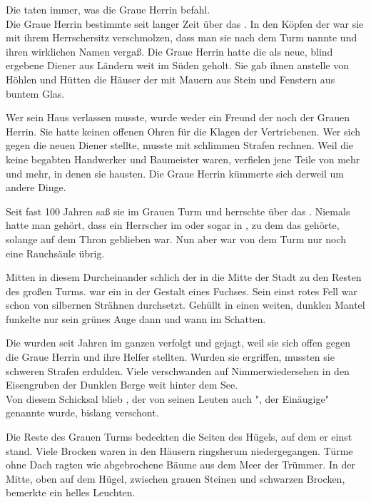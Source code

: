 \begin{huge}
Die {\Bangiri} taten immer, was die Graue Herrin befahl.\\
Die Graue Herrin bestimmte seit langer Zeit über das {\Enland}. In den Köpfen der {\Enlaender} war sie mit ihrem Herrschersitz verschmolzen, dass man sie nach dem Turm nannte und ihren wirklichen Namen vergaß. Die Graue Herrin hatte die {\Bangiri} als neue, blind ergebene Diener aus Ländern weit im Süden geholt. Sie gab ihnen anstelle von Höhlen und Hütten die Häuser der {\Enlaender} mit Mauern aus Stein und Fenstern aus buntem Glas. 

Wer sein Haus verlassen musste, wurde weder ein Freund der {\Bangiri} noch der Grauen Herrin. Sie hatte keinen offenen Ohren für die Klagen der Vertriebenen. Wer sich gegen die neuen Diener stellte, musste mit schlimmen Strafen rechnen. Weil die \Bangiri keine begabten Handwerker und Baumeister waren, verfielen jene Teile von {\Tern} mehr und mehr, in denen sie hausten. Die Graue Herrin kümmerte sich derweil um andere Dinge. 

Seit fast 100 Jahren saß sie im Grauen Turm und herrschte über das {\Enland}. Niemals hatte man gehört, dass ein Herrscher im {\Enland} oder sogar in {\Rhingell}, zu dem das {\Enland} gehörte, solange auf dem Thron geblieben war. Nun aber war von dem Turm nur noch eine Rauchsäule übrig. 

Mitten in diesem Durcheinander schlich {\Eno} der {\Schattenlaufer} in die Mitte der Stadt zu den Resten des großen Turms. {\Eno} war ein {\Enlaender} in der Gestalt eines Fuchses. Sein einst rotes Fell war schon von silbernen Strähnen durchsetzt. Gehüllt in einen weiten, dunklen Mantel funkelte nur sein grünes Auge dann und wann im Schatten. 

Die {\Schattenlaufer} wurden seit Jahren im ganzen {\Enland} verfolgt und gejagt, weil sie sich offen gegen die Graue Herrin und ihre Helfer stellten. Wurden sie ergriffen, mussten sie schweren Strafen erdulden. Viele verschwanden auf Nimmerwiedersehen in den Eisengruben der Dunklen Berge weit hinter dem See.\\
Von diesem Schicksal blieb {\Eno}, der von seinen Leuten auch "{\Eno}, der Einäugige" genannte wurde, bislang verschont. 

Die Reste des Grauen Turms bedeckten die Seiten des Hügels, auf dem er einst stand. Viele Brocken waren in den Häusern ringsherum niedergegangen. Türme ohne Dach ragten wie abgebrochene Bäume aus dem Meer der Trümmer. In der Mitte, oben auf dem Hügel, zwischen grauen Steinen und schwarzen Brocken, bemerkte {\Eno} ein helles Leuchten. 


\end{huge}
